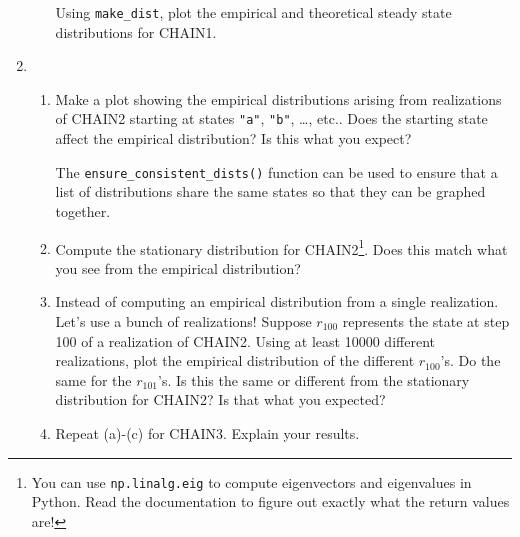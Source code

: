 \documentclass[letter]{article}
\begin{document}
\begin{enumerate}
\begin{enumerate}
				Using \verb|make_dist|, plot the empirical and theoretical steady state distributions for CHAIN1.
		\end{enumerate}

		\item
			\begin{enumerate}
				\item Make a plot showing the empirical distributions arising from realizations of CHAIN2 starting
					at states {\tt "a"}, {\tt "b"}, \ldots, etc.. Does the starting state affect the empirical
					distribution? Is this what you expect?

					The \verb|ensure_consistent_dists()| function can be used to ensure that a list of distributions
					share the same states so that they can be graphed together.
				\item Compute the stationary distribution for CHAIN2\footnote{ You can use {\tt np.linalg.eig}
					to compute eigenvectors and eigenvalues in Python. Read the documentation to figure out exactly
					what the return values are!}. Does this match what you see from the empirical distribution?
				\item Instead of computing an empirical distribution from a single realization. Let's use a bunch of realizations!
					Suppose $r_{100}$ represents the state at step 100 of a realization of CHAIN2. Using at least 10000
					different realizations, plot the empirical distribution of the different $r_{100}$'s. Do
					the same for the $r_{101}$'s. Is this the same
					or different from the stationary distribution for CHAIN2? Is that what you expected?
				\item Repeat (a)-(c) for CHAIN3. Explain your results.
			\end{enumerate}


\end{enumerate}
\end{document}
